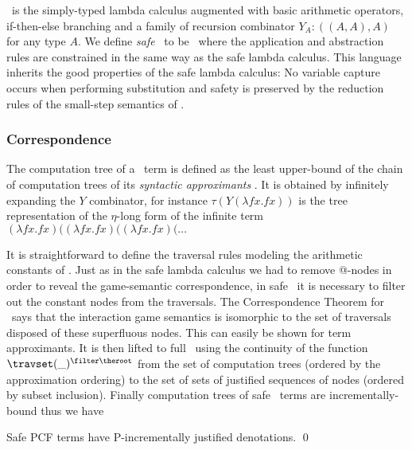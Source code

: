 \pcf\ is the simply-typed lambda calculus augmented with basic
arithmetic operators, if-then-else branching and a family of
recursion combinator $Y_A : ((A,A),A)$ for any type $A$.  We define
\emph{safe} \pcf\ to be \pcf\ where the application and abstraction
rules are constrained in the same way as the safe lambda calculus.
This language inherits the good properties of the safe lambda
calculus: No variable capture occurs when performing substitution
and safety is preserved by the reduction rules of the small-step
semantics of \pcf.

\subsubsection{Correspondence}

The computation tree of a \pcf\ term is defined as the least
upper-bound of the chain of computation trees of its \emph{syntactic
approximants} \cite{abramsky:game-semantics-tutorial}.  It is
obtained by infinitely expanding the $Y$ combinator, for instance
$\tau(Y (\lambda f x. f x))$ is the tree representation of the
$\eta$-long form of the infinite term $(\lambda f x. f x)
 ((\lambda f x. f x) ((\lambda f x. f x) ( \ldots$

It is straightforward to define the traversal rules modeling the
arithmetic constants of \pcf. Just as in the safe lambda calculus we
had to remove @-nodes in order to reveal the game-semantic
correspondence, in safe \pcf\ it is necessary to filter out the
constant nodes from the traversals. The Correspondence Theorem for
\pcf\ says that the interaction game semantics is isomorphic to the
set of traversals disposed of these superfluous nodes. This can
easily be shown for term approximants. It is then lifted to full
\pcf\ using the continuity of the function $\travset(\_)^{\filter
\theroot}$ from the set of computation trees (ordered by the
approximation ordering) to the set of sets of justified sequences of
nodes (ordered by subset inclusion). Finally computation trees of
safe \pcf\ terms are incrementally-bound thus we have
\begin{theorem}
\label{thm:safepcfpincr} Safe PCF terms have P-incrementally
justified denotations. \qed
\end{theorem}



